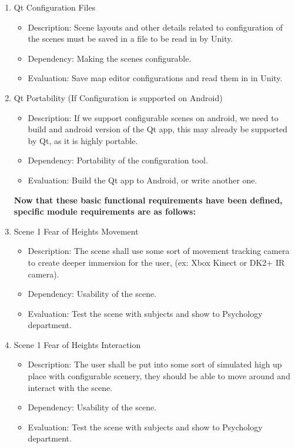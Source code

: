 \documentclass[a4paper,10pt,twoside]{article}
\begin{document}
\begin{enumerate}
		\item Qt Configuration Files
		\begin{itemize}
		\item Description: Scene layouts and other details related to configuration of the scenes must be saved in a file to be read in by Unity.
		\item Dependency:  Making the scenes configurable.
		\item Evaluation:  Save map editor configurations and read them in in Unity.
		\end{itemize}
		\item Qt Portability (If Configuration is supported on Android)
		\begin{itemize}
		\item Description: If we support configurable scenes on android, we need to build and android version of the Qt app, this may already be supported by Qt, as it is highly portable.
		\item Dependency:  Portability of the configuration tool.
		\item Evaluation:  Build the Qt app to Android, or write another one. 
		\end{itemize}
		\textbf{ Now that these basic functional requirements have been defined, specific module requirements are as follows:}
		
		\item Scene 1 Fear of Heights Movement 
		\begin{itemize}
		\item Description: The scene shall use some sort of movement tracking camera to create deeper immersion for the user, (ex: Xbox Kinect or DK2+ IR camera).
		\item Dependency: Usability of the scene.
		\item Evaluation: Test the scene with subjects and show to Psychology department. 
		\end{itemize}
		
		\item Scene 1 Fear of Heights Interaction 
		\begin{itemize}
		\item Description: The user shall be put into some sort of simulated high up place with configurable scenery, they should be able to move around and interact with the scene.
		\item Dependency: Usability of the scene.
		\item Evaluation: Test the scene with subjects and show to Psychology department. 
		\end{itemize}
		

\end{enumerate}
\end{document}
